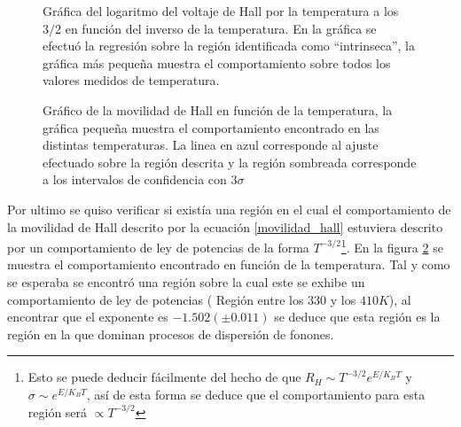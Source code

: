 \documentclass[%
 reprint,
 amsmath,amssymb,
 aps,
]{revtex4-1}
\begin{document}
\begin{figure}[h]
\caption{\label{Region intrinseca}Gráfica del logaritmo del voltaje de Hall por la temperatura a los $3/2$ en función del inverso de la temperatura. En la gráfica se efectuó la regresión  sobre la región identificada como ``intrinseca'', la gráfica más pequeña muestra el comportamiento sobre todos los valores medidos de temperatura.}
\end{figure}


\begin{figure}[h!]
\caption{\label{movilidad de Hall}Gráfico de la movilidad de Hall en función de la temperatura, la gráfica pequeña muestra el comportamiento encontrado en las distintas temperaturas. La linea en azul corresponde al ajuste efectuado sobre la región descrita y la región sombreada corresponde a los intervalos de confidencia con $3\sigma$}
\end{figure}

Por ultimo se quiso verificar si existía una región en el cual el comportamiento de la movilidad de Hall descrito por la ecuación \eqref{movilidad_hall} estuviera descrito por un comportamiento de ley de potencias de la forma $T^{-3/2}$\footnote{Esto se puede deducir fácilmente del hecho de que $R_H\sim T^{-3/2}e^{E/K_BT}$ y $\sigma \sim e^{E/K_BT}$, así de esta forma se deduce que el comportamiento para esta región será $\propto T^{-3/2}$}. En la figura \ref{movilidad de Hall} se muestra el comportamiento encontrado en función de la temperatura. Tal y como se esperaba se encontró una región sobre la cual este se exhibe un comportamiento de ley de potencias ( Región entre los $330$ y los $410 K$), al encontrar que el exponente es $-1.502 (\pm 0.011)$ se deduce que esta región es la región en la que dominan procesos de dispersión de fonones.
\end{document}

